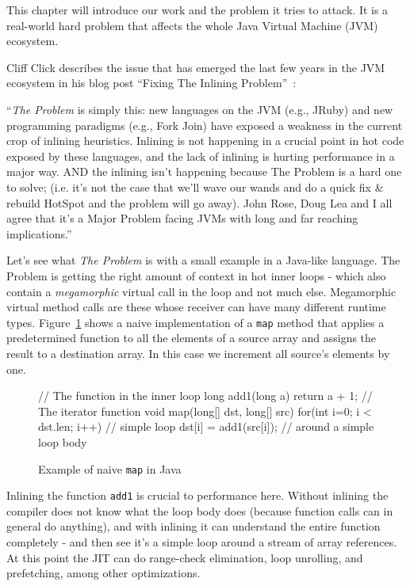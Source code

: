 \label{introduction}
This chapter will introduce our work and the problem it tries to attack. It is a
real-world hard problem that affects the whole Java Virtual Machine (JVM) ecosystem.

Cliff Click describes the issue that has emerged the last few years in the JVM ecosystem in his blog post ``Fixing The Inlining Problem''~\cite{cliffc:TheProblem}:

``\emph{The Problem} is simply this: new languages on the JVM (e.g., JRuby) and new
programming paradigms (e.g., Fork Join) have exposed a weakness in the current
crop of inlining heuristics.  Inlining is not happening in a crucial point in
hot code exposed by these languages, and the lack of inlining is hurting
performance in a major way.  AND the inlining isn't happening because The
Problem is a hard one to solve; (i.e. it's not the case that we'll wave our
wands and do a quick fix \& rebuild HotSpot and the problem will go away).  
John Rose, Doug Lea and I all agree that it's a Major Problem facing JVMs with long
and far reaching implications.''

Let's see what \emph{The Problem} is with a small example in a Java-like language. The
Problem is getting the right amount of context in hot inner loops - which also
contain a \emph{megamorphic} virtual call in the loop and not much else. Megamorphic virtual method calls are these whose receiver can have many different runtime types. Figure~\ref{java_naive_map} 
shows a naive implementation of a \texttt{map} method that applies a predetermined
function to all the elements of a source array and assigns the result to a
destination array. In this case we increment all source's elements by one.

\begin{figure}
\begin{javaCode}
// The function in the inner loop
long add1(long a) {return a + 1;}
// The iterator function
void map(long[] dst, long[] src) {
  for(int i=0; i < dst.len; i++) // simple loop
    dst[i] = add1(src[i]); // around a simple loop body
}
\end{javaCode}
\caption[Example of naive \texttt{map} in Java]{Example of naive \texttt{map} in Java}
\label{java_naive_map}
\end{figure}

Inlining the function \texttt{add1} is crucial to performance here.  Without
inlining the compiler does not know what the loop body does (because function
calls can in general do anything), and with inlining it can understand the
entire function completely - and then see it's a simple loop around a stream of
array references.  At this point the JIT can do range-check elimination, loop
unrolling, and prefetching, among other optimizations.

